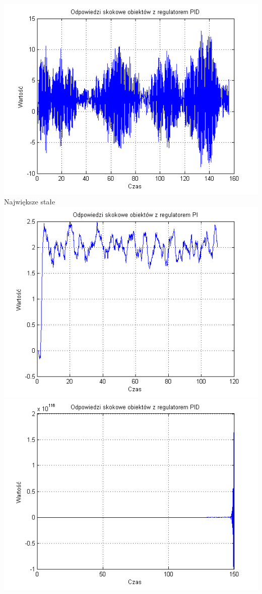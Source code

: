 \documentclass[10pt,a4paper]{article}
\begin{document}
\includegraphics[scale=1]{images/cztery/skrypt_15.png}\\
\newpage
Największe stałe\\
\includegraphics[scale=1]{images/trzy/skrypt_16.png}\\
\includegraphics[scale=1]{images/cztery/skrypt_16.png}\\
\newpage
\end{document}

